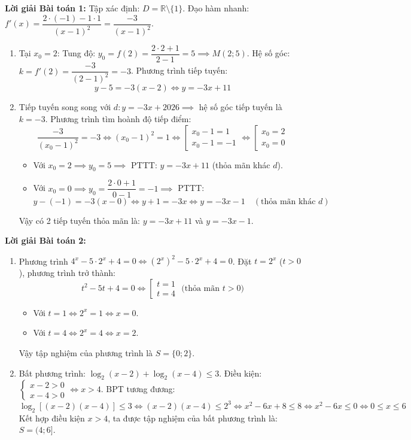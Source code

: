 \documentclass[12pt, a4paper]{article}
\begin{document}
\textbf{Lời giải Bài toán 1:}
Tập xác định: $D = \mathbb{R} \setminus \{1\}$.
Đạo hàm nhanh: $f'(x) = \dfrac{2 \cdot (-1) - 1 \cdot 1}{(x - 1)^2} = \dfrac{-3}{(x - 1)^2}$.
\begin{enumerate}[label=\alph*)]
    \item Tại $x_0 = 2$:
    Tung độ: $y_0 = f(2) = \dfrac{2 \cdot 2 + 1}{2 - 1} = 5 \implies M(2; 5)$.
    Hệ số góc: $k = f'(2) = \dfrac{-3}{(2 - 1)^2} = -3$.
    Phương trình tiếp tuyến:
    $$y - 5 = -3(x - 2) \iff y = -3x + 11$$

    \item Tiếp tuyến song song với $d: y = -3x + 2026 \implies$ hệ số góc tiếp tuyến là $k = -3$.
    Phương trình tìm hoành độ tiếp điểm:
    $$\dfrac{-3}{(x_0 - 1)^2} = -3 \iff (x_0 - 1)^2 = 1 \iff \left[\begin{array}{l} x_0 - 1 = 1 \\ x_0 - 1 = -1 \end{array}\right. \iff \left[\begin{array}{l} x_0 = 2 \\ x_0 = 0 \end{array}\right.$$
    \begin{itemize}
        \item Với $x_0 = 2 \implies y_0 = 5 \implies$ PTTT: $y = -3x + 11$ (thỏa mãn khác $d$).
        \item Với $x_0 = 0 \implies y_0 = \dfrac{2 \cdot 0 + 1}{0 - 1} = -1 \implies$ PTTT:
        $$y - (-1) = -3(x - 0) \iff y + 1 = -3x \iff y = -3x - 1 \quad (\text{thỏa mãn khác } d)$$
    \end{itemize}
    Vậy có 2 tiếp tuyến thỏa mãn là: $y = -3x + 11$ và $y = -3x - 1$.
\end{enumerate}

\textbf{Lời giải Bài toán 2:}
\begin{enumerate}[label=\alph*)]
    \item Phương trình $4^x - 5 \cdot 2^x + 4 = 0 \iff (2^x)^2 - 5 \cdot 2^x + 4 = 0$.
    Đặt $t = 2^x$ ($t > 0$), phương trình trở thành:
    $$t^2 - 5t + 4 = 0 \iff \left[\begin{array}{l} t = 1 \\ t = 4 \end{array}\right. \text{ (thỏa mãn } t > 0)$$
    \begin{itemize}
        \item Với $t = 1 \iff 2^x = 1 \iff x = 0$.
        \item Với $t = 4 \iff 2^x = 4 \iff x = 2$.
    \end{itemize}
    Vậy tập nghiệm của phương trình là $S = \{0; 2\}$.

    \item Bất phương trình: $\log_2(x - 2) + \log_2(x - 4) \le 3$.
    Điều kiện: $\begin{cases} x - 2 > 0 \\ x - 4 > 0 \end{cases} \iff x > 4$.
    BPT tương đương:
    $$\log_2\left[(x - 2)(x - 4)\right] \le 3 \iff (x - 2)(x - 4) \le 2^3 \iff x^2 - 6x + 8 \le 8 \iff x^2 - 6x \le 0 \iff 0 \le x \le 6$$
    Kết hợp điều kiện $x > 4$, ta được tập nghiệm của bất phương trình là: $S = (4; 6]$.
\end{enumerate}
\end{document}
